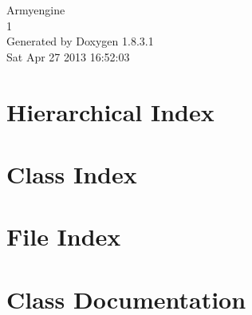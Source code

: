 \documentclass{book}
\begin{document}
\hypersetup{pageanchor=false,citecolor=blue}
\begin{titlepage}
\vspace*{7cm}
\begin{center}
{\Large Armyengine \\[1ex]\large 1 }\\
\vspace*{1cm}
{\large Generated by Doxygen 1.8.3.1}\\
\vspace*{0.5cm}
{\small Sat Apr 27 2013 16:52:03}\\
\end{center}
\end{titlepage}
\clearemptydoublepage
{}
\tableofcontents
\clearemptydoublepage
{}
\hypersetup{pageanchor=true,citecolor=blue}
\chapter{Hierarchical Index}

\chapter{Class Index}

\chapter{File Index}

\chapter{Class Documentation}


































\end{document}
